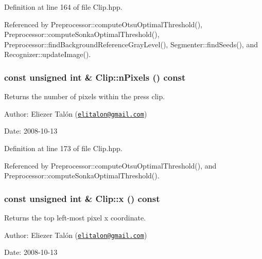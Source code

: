 Definition at line 164 of file Clip.hpp.

Referenced by Preprocessor::computeOtsuOptimalThreshold(), Preprocessor::computeSonkaOptimalThreshold(), Preprocessor::findBackgroundReferenceGrayLevel(), Segmenter::findSeeds(), and Recognizer::updateImage().\hypertarget{class_clip_9acfff7074239516465bcca11586c48d}{
\subsubsection[nPixels]{\setlength{\rightskip}{0pt plus 5cm}const unsigned int \& Clip::nPixels () const}}
\label{class_clip_9acfff7074239516465bcca11586c48d}


Returns the number of pixels within the press clip. 

\begin{Desc}
\item[Author:]Eliezer Talón (\href{mailto:elitalon@gmail.com}{\tt elitalon@gmail.com}) \end{Desc}
\begin{Desc}
\item[Date:]2008-10-13 \end{Desc}


Definition at line 173 of file Clip.hpp.

Referenced by Preprocessor::computeOtsuOptimalThreshold(), and Preprocessor::computeSonkaOptimalThreshold().\hypertarget{class_clip_fcedad938315faff5d577670f9219c61}{
\subsubsection[x]{\setlength{\rightskip}{0pt plus 5cm}const unsigned int \& Clip::x () const}}
\label{class_clip_fcedad938315faff5d577670f9219c61}


Returns the top left-most pixel x coordinate. 

\begin{Desc}
\item[Author:]Eliezer Talón (\href{mailto:elitalon@gmail.com}{\tt elitalon@gmail.com}) \end{Desc}
\begin{Desc}
\item[Date:]2008-10-13 \end{Desc}


